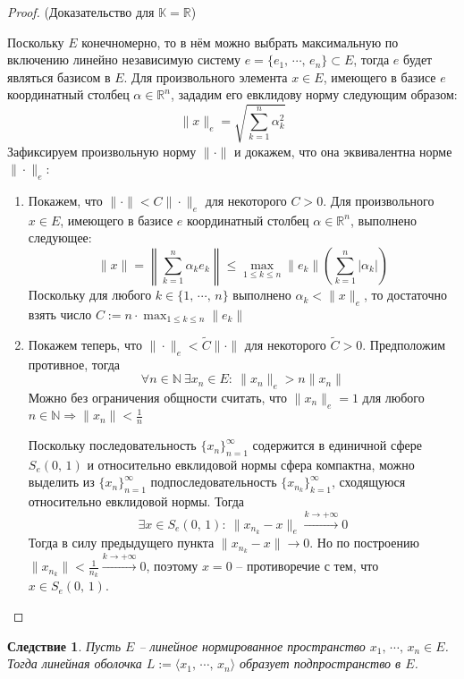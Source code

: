 \documentclass[a4paper,12pt]{article}
\renewcommand{\leq}{\ensuremath{\leqslant}}
\theoremstyle{plain}
\newtheorem*{corollary}{Следствие}
\theoremstyle{definition}
\theoremstyle{remark}
\begin{document}
\begin{proof}
	(Доказательство для $\mathbb{K} = \mathbb{R}$)

	Поскольку $E$ конечномерно, то в нём можно выбрать максимальную по включению линейно независимую систему $e = \{e_1,\,\cdots,\,e_n\} \subset E$, тогда $e$ будет являться базисом в $E$. Для произвольного элемента $x \in E$, имеющего в базисе $e$ координатный столбец $\alpha \in \mathbb{R}^n$, зададим его евклидову норму следующим образом:
	\[
		\|x\|_e = \sqrt{\sum_{k = 1}^n \alpha_k^2}
	\]
	Зафиксируем произвольную норму $\|\cdot\|$ и докажем, что она эквивалентна норме $\|\cdot\|_e$:
	\begin{enumerate}
		\item Покажем, что $\|\cdot\| < C\|\cdot\|_e$ для некоторого $C > 0$. Для произвольного $x \in E$, имеющего в базисе $e$ координатный столбец $\alpha \in \mathbb{R}^n$, выполнено следующее:
		      \[
			      \|x\| = \left\|\sum_{k = 1}^n \alpha_ke_k\right\| \leq \max_{1 \leq k \leq n}\|e_k\| \left(\sum_{k = 1}^n \vert \alpha_k\vert\right)
		      \]
		      Поскольку для любого $k \in \{1,\, \cdots,\,n\}$ выполнено $\alpha_k < \|x\|_e$, то достаточно взять число $C := n\cdot\max_{1\leq k\leq n}\|e_k\|$
		\item Покажем теперь, что $\|\cdot\|_e < \tilde{C}\|\cdot\|$ для некоторого $\tilde{C} > 0$. Предположим противное, тогда
		      \[
			      \forall n \in \mathbb{N} \: \exists x_n \in E :\: \|x_n\|_e > n\|x_n\|
		      \]
		      Можно без ограничения общности считать, что $\|x_n\|_e = 1$ для любого $n \in \mathbb{N} \Rightarrow \|x_n\| < \frac{1}{n}$

		      Поскольку последовательность $\{x_n\}_{n = 1}^\infty$ содержится в единичной сфере $S_e(0,\,1)$ и относительно евклидовой нормы сфера компактна, можно выделить из $\{x_n\}_{n = 1}^\infty$ подпоследовательность $\{x_{n_k}\}_{k = 1}^\infty$, сходящуюся относительно евклидовой нормы. Тогда
		      \[
			      \exists x \in S_e(0,\,1) :\: \|x_{n_k} - x\|_e \overset{k \to +\infty}{\to} 0
		      \]
		      Тогда в силу предыдущего пункта $\|x_{n_k} - x\| \to 0$. Но по построению $\|x_{n_k}\| < \frac{1}{n_k} \overset{k \to +\infty}{\to} 0$, поэтому $x = 0$ -- противоречие с тем, что $x \in S_e(0,\,1)$.
	\end{enumerate}
\end{proof}

\begin{corollary}
	Пусть $E$ -- линейное нормированное пространство $x_1,\,\cdots,\,x_n \in E$. Тогда линейная оболочка $L := \langle x_1,\,\cdots,\, x_n\rangle$ образует подпространство в $E$.
\end{corollary}
\end{document}
